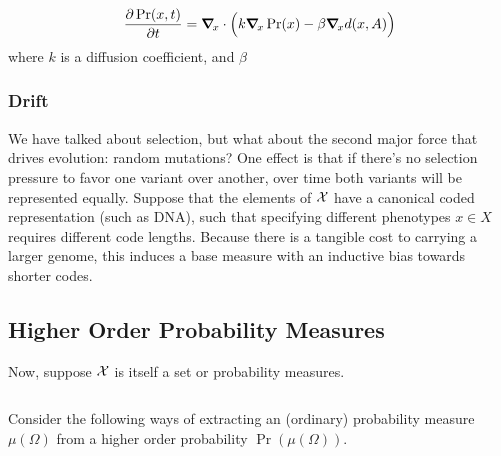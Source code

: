 \documentclass{article}
\begin{document}
\[
    \frac{\partial \Pr(x, t)}{\partial t} = \boldsymbol\nabla_{\!x} \cdot \Big( k \boldsymbol\nabla_{\!x} \Pr (x) - \beta \boldsymbol\nabla_{\!x} d(x, A) \Big)
\]
where $k$ is a diffusion coefficient, and $\beta$



\subsubsection{Drift}
We have talked about selection, but what about the second major force that drives evolution: random mutations?
One effect is that if there's no selection pressure to favor one variant over another, over time both variants will be represented equally.
Suppose that the elements of $\mathcal X$ have a canonical coded representation (such as DNA), such that specifying different phenotypes $x \in X$ requires different code lengths.
Because there is a tangible cost to carrying a larger genome, this induces a base measure with an inductive bias towards shorter codes.

%

\subsection{Higher Order Probability Measures}
Now, suppose $\mathcal X$ is itself a set or probability measures.

\[
\]



Consider the following ways of extracting an (ordinary) probability measure $\mu(\Omega)$
from a higher order probability $\Pr(\mu(\Omega))$.
\end{document}
